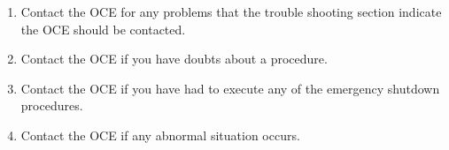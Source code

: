 {\bf
\begin{enumerate}
\item Contact the OCE for any problems that the trouble shooting 
  section indicate the OCE should be contacted.
\item Contact the OCE if you have doubts about a procedure.
\item Contact the OCE if you have had to execute any of the 
  emergency shutdown procedures.
\item Contact the OCE if any abnormal situation occurs.
\end{enumerate}
}
